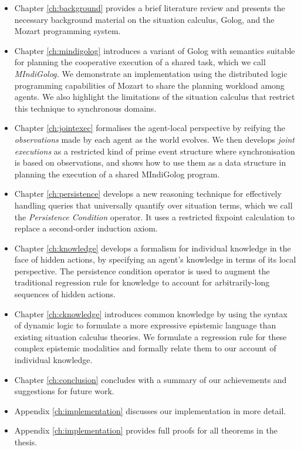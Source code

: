 \begin{itemize}
\item Chapter \ref{ch:background} provides a brief literature review and
presents the necessary background material on the situation calculus,
Golog, and the Mozart programming system. 
\item Chapter \ref{ch:mindigolog} introduces a variant of Golog with semantics
suitable for planning the cooperative execution of a shared task,
which we call \emph{MIndiGolog.} We demonstrate an implementation
using the distributed logic programming capabilities of Mozart to
share the planning workload among agents. We also highlight the limitations
of the situation calculus that restrict this technique to synchronous
domains. 
\item Chapter \ref{ch:jointexec} formalises the agent-local perspective
by reifying the \emph{observations} made by each agent as the world
evolves. We then develops \emph{joint executions} as a restricted
kind of prime event structure where synchronisation is based on observations,
and shows how to use them as a data structure in planning the execution
of a shared MIndiGolog program.
\item Chapter \ref{ch:persistence} develops a new reasoning technique for
effectively handling queries that universally quantify over situation
terms, which we call the \emph{Persistence Condition} operator. It
uses a restricted fixpoint calculation to replace a second-order induction
axiom. 
\item Chapter \ref{ch:knowledge} develops a formalism for individual knowledge
in the face of hidden actions, by specifying an agent's knowledge
in terms of its local perspective. The persistence condition operator
is used to augment the traditional regression rule for knowledge to
account for arbitrarily-long sequences of hidden actions. 
\item Chapter \ref{ch:cknowledge} introduces common knowledge by using
the syntax of dynamic logic to formulate a more expressive epistemic
language than existing situation calculus theories. We formulate a
regression rule for these complex epistemic modalities and formally
relate them to our account of individual knowledge.
\item Chapter \ref{ch:conclusion} concludes with a summary of our achievements
and suggestions for future work. 
\item Appendix \ref{ch:implementation} discusses our implementation in
more detail.
\item Appendix \ref{ch:implementation} provides full proofs for all theorems
in the thesis.
\end{itemize}
